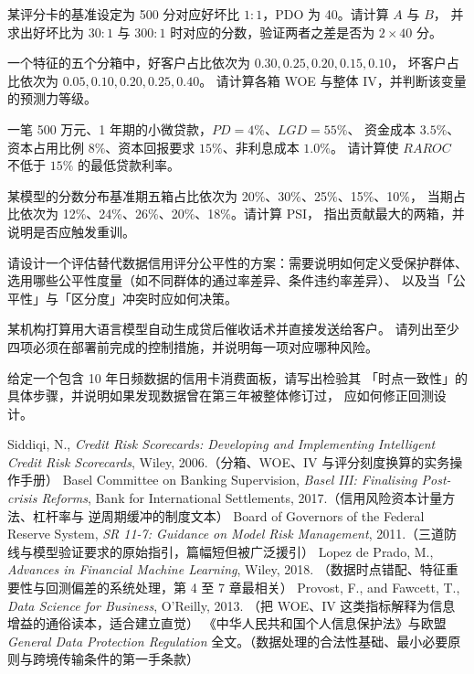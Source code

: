 \begin{exercises}
  \item 某评分卡的基准设定为 500 分对应好坏比 $1:1$，PDO 为 40。请计算 $A$ 与 $B$，
        并求出好坏比为 $30:1$ 与 $300:1$ 时对应的分数，验证两者之差是否为 $2 \times 40$ 分。
  \item 一个特征的五个分箱中，好客户占比依次为 $0.30, 0.25, 0.20, 0.15, 0.10$，
        坏客户占比依次为 $0.05, 0.10, 0.20, 0.25, 0.40$。
        请计算各箱 WOE 与整体 IV，并判断该变量的预测力等级。
  \item 一笔 500 万元、1 年期的小微贷款，$PD = 4\%$、$LGD = 55\%$、
        资金成本 $3.5\%$、资本占用比例 $8\%$、资本回报要求 $15\%$、非利息成本 $1.0\%$。
        请计算使 $RAROC$ 不低于 $15\%$ 的最低贷款利率。
  \item 某模型的分数分布基准期五箱占比依次为 20\%、30\%、25\%、15\%、10\%，
        当期占比依次为 12\%、24\%、26\%、20\%、18\%。请计算 PSI，
        指出贡献最大的两箱，并说明是否应触发重训。
  \item 请设计一个评估替代数据信用评分公平性的方案：需要说明如何定义受保护群体、
        选用哪些公平性度量（如不同群体的通过率差异、条件违约率差异）、
        以及当「公平性」与「区分度」冲突时应如何决策。
  \item 某机构打算用大语言模型自动生成贷后催收话术并直接发送给客户。
        请列出至少四项必须在部署前完成的控制措施，并说明每一项对应哪种风险。
  \item 给定一个包含 10 年日频数据的信用卡消费面板，请写出检验其
        「时点一致性」的具体步骤，并说明如果发现数据曾在第三年被整体修订过，
        应如何修正回测设计。
\end{exercises}

\begin{furtherreading}
 Siddiqi, N., \emph{Credit Risk Scorecards: Developing and Implementing Intelligent
  Credit Risk Scorecards}, Wiley, 2006.（分箱、WOE、IV 与评分刻度换算的实务操作手册）
 Basel Committee on Banking Supervision, \emph{Basel III: Finalising Post-crisis
  Reforms}, Bank for International Settlements, 2017.（信用风险资本计量方法、杠杆率与
  逆周期缓冲的制度文本）
 Board of Governors of the Federal Reserve System, \emph{SR 11-7: Guidance on Model
  Risk Management}, 2011.（三道防线与模型验证要求的原始指引，篇幅短但被广泛援引）
 Lopez de Prado, M., \emph{Advances in Financial Machine Learning}, Wiley, 2018.
  （数据时点错配、特征重要性与回测偏差的系统处理，第 4 至 7 章最相关）
 Provost, F., and Fawcett, T., \emph{Data Science for Business}, O'Reilly, 2013.
  （把 WOE、IV 这类指标解释为信息增益的通俗读本，适合建立直觉）
 《中华人民共和国个人信息保护法》与欧盟 \emph{General Data Protection Regulation}
  全文。（数据处理的合法性基础、最小必要原则与跨境传输条件的第一手条款）
\end{furtherreading}
